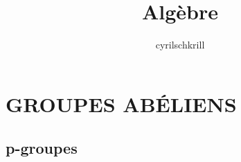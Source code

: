 \documentclass{article}
\title{Algèbre}
\author{cyrilschkrill}
\begin{document}
\maketitle

\section{GROUPES ABÉLIENS}
\subsection{p-groupes}
\end{document}
